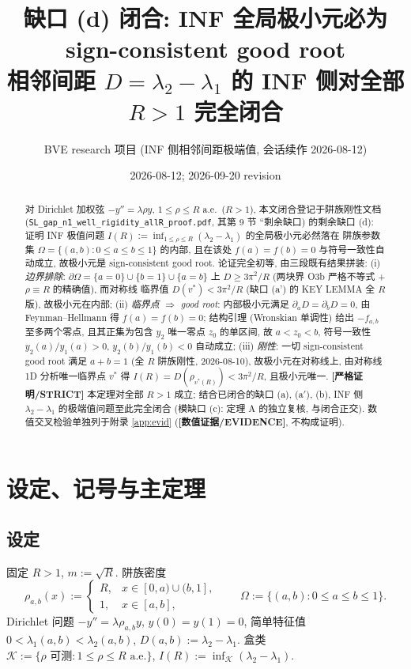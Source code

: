 \documentclass[UTF8]{ctexart}
\title{缺口 (d) 闭合: INF 全局极小元必为 sign-consistent good root\\[-2mm]
\large 相邻间距 $D=\lambda_2-\lambda_1$ 的 INF 侧对全部 $R>1$ 完全闭合}
\author{BVE research 项目 (INF 侧相邻间距极端值, 会话续作 2026-08-12)}
\date{2026-08-12; 2026-09-20 revision}
\newcommand{\STRICT}{\textbf{[严格证明/STRICT]}}
\newcommand{\EVID}{\textbf{[数值证据/EVIDENCE]}}
\begin{document}
\maketitle

\begin{abstract}
对 Dirichlet 加权弦 $-y''=\lambda\rho y$, $1\le\rho\le R$ a.e.\ ($R>1$),
本文闭合登记于阱族刚性文档 (\texttt{SL\_gap\_n1\_well\_rigidity\_allR\_proof.pdf}, 其第 9 节 ``剩余缺口) 的剩余缺口 (d): 证明 INF 极值问题
$I(R):=\inf_{1\le\rho\le R}(\lambda_2-\lambda_1)$ 的全局极小元必然落在
阱族参数集 $\Omega=\{(a,b):0\le a\le b\le1\}$ 的内部, 且在该处
$f(a)=f(b)=0$ 与符号一致性自动成立, 故极小元是 sign-consistent good root.
论证完全初等, 由三段既有结果拼装:
(i) \emph{边界排除}: $\partial\Omega=\{a=0\}\cup\{b=1\}\cup\{a=b\}$ 上
$D\ge3\pi^2/R$ (两块界 O3b 严格不等式 + $\rho\equiv R$ 的精确值), 而对称线
临界值 $D(v^*)<3\pi^2/R$ (缺口 (a') 的 KEY LEMMA 全 $R$ 版), 故极小元在内部;
(ii) \emph{临界点 $\Rightarrow$ good root}: 内部极小元满足 $\partial_aD=\partial_bD=0$,
由 Feynman--Hellmann 得 $f(a)=f(b)=0$; 结构引理 (Wronskian 单调性) 给出
$-f_{a,b}$ 至多两个零点, 且其正集为包含 $y_2$ 唯一零点 $z_0$ 的单区间, 故
$a<z_0<b$, 符号一致性 $y_2(a)/y_1(a)>0$, $y_2(b)/y_1(b)<0$ 自动成立;
(iii) \emph{刚性}: 一切 sign-consistent good root 满足 $a+b=1$ (全 $R$
阱族刚性, 2026-08-10), 故极小元在对称线上, 由对称线 1D 分析唯一临界点
$v^*$ 得 $I(R)=D(\rho_{v^*(R)})<3\pi^2/R$, 且极小元唯一.
\STRICT{} 本定理对全部 $R>1$ 成立; 结合已闭合的缺口 (a), (a$'$), (b),
INF 侧 $\lambda_2-\lambda_1$ 的极端值问题至此完全闭合 (模缺口 (c):
定理 A 的独立复核, 与闭合正交). 数值交叉检验单独列于附录 \ref{app:evid}
(\EVID, 不构成证明).
\end{abstract}

\tableofcontents

\section{设定、记号与主定理}\label{sec:setup}

\subsection{设定}
固定 $R>1$, $m:=\sqrt R$. 阱族密度
\begin{equation}
	\rho_{a,b}(x):=
	\begin{cases}
		R, & x\in[0,a)\cup(b,1],\\
		1, & x\in[a,b],
	\end{cases}
	\qquad \Omega:=\{(a,b):0\le a\le b\le1\}.
	\label{eq:well}
\end{equation}
Dirichlet 问题 $-y''=\lambda\rho_{a,b}y$, $y(0)=y(1)=0$, 简单特征值
$0<\lambda_1(a,b)<\lambda_2(a,b)$, $D(a,b):=\lambda_2-\lambda_1$.
盒类 $\mathcal K:=\{\rho\text{ 可测}:1\le\rho\le R\text{ a.e.}\}$,
$I(R):=\inf_{\mathcal K}(\lambda_2-\lambda_1)$.
\end{document}
